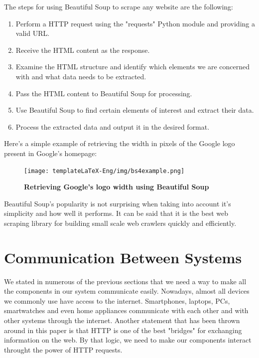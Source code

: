 \documentclass[12pt,a4paper,twoside]{report}
\begin{document}
The steps for using Beautiful Soup to scrape any website are the following:
\begin{enumerate}
    \item Perform a HTTP request using the "requests" Python module and providing a valid URL.
    \item Receive the HTML content as the response.
    \item Examine the HTML structure and identify which elements we are concerned with and what data needs to be extracted.
    \item Pass the HTML content to Beautiful Soup for processing.
    \item Use Beautiful Soup to find certain elements of interest and extract their data.
    \item Process the extracted data and output it in the desired format.
\end{enumerate}

Here's a simple example of retrieving the width in pixels of the Google logo present in Google's homepage: 

\begin{figure}[H]
    \begin{center}
        \texttt{[image: templateLaTeX-Eng/img/bs4example.png]}
        \caption{\bf Retrieving Google's logo width using Beautiful Soup}
    \end{center}
\end{figure}

Beautiful Soup's popularity is not surprising when taking into account it's simplicity and how well it performs. It can be said that it is the best web scraping library for building small scale web crawlers quickly and efficiently.

\section{Communication Between Systems}
We stated in numerous of the previous sections that we need a way to make all the components in our system communicate easily. Nowadays, almost all devices we commonly use have access to the internet. Smartphones, laptops, PCs, smartwatches and even home appliances communicate with each other and with other systems through the internet. Another statement that has been thrown around in this paper is that HTTP is one of the best "bridges" for exchanging information on the web. By that logic, we need to make our components interact throught the power of HTTP requests.
\end{document}
